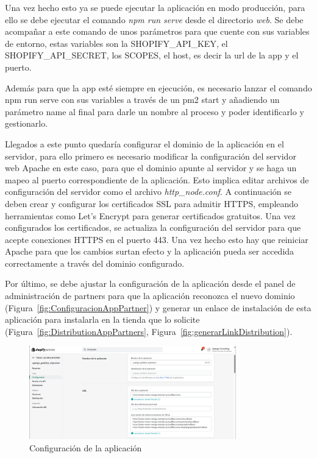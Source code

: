 \documentclass[12pt]{article}
\begin{document}
Una vez hecho esto ya se puede ejecutar la aplicación en modo producción, para ello se debe ejecutar el comando \textit{npm run serve} desde el directorio \textit{web}. Se debe acompañar
a este comando de unos parámetros para que cuente con sus variables de entorno, estas variables son la SHOPIFY\_API\_KEY, el SHOPIFY\_API\_SECRET, los SCOPES,  el host, es decir la url de la app y el puerto.

Además para que la app esté siempre en ejecución, es necesario lanzar el comando npm run serve con sus variables a través de un pm2 start y añadiendo un parámetro name al final para
darle un nombre al proceso y poder identificarlo y gestionarlo. 

Llegados a este punto quedaría configurar el dominio de la aplicación en el servidor, para ello primero es necesario modificar la configuración del servidor web Apache en este caso, para que 
el dominio apunte al servidor y se haga un mapeo al puerto correspondiente de la aplicación. Esto implica editar archivos de configuración del servidor como el archivo \textit{http\_node.conf}. 
A continuación se deben crear y configurar los certificados SSL para admitir HTTPS, empleando herramientas como Let's Encrypt para generar certificados gratuitos. Una vez configurados los
certificados, se actualiza la configuración del servidor para que acepte conexiones HTTPS en el puerto 443. Una vez hecho esto hay que reiniciar Apache para que los cambios surtan
efecto y la aplicación pueda ser accedida correctamente a través del dominio configurado.

Por último, se debe ajustar la configuración de la aplicación desde el panel de administración de partners para que la aplicación reconozca el nuevo dominio (Figura~\ref{fig:ConfiguracionAppPartner}) y generar un enlace de instalación de esta aplicación
para instalarla en la tienda que lo solicite (Figura~\ref{fig:DistributionAppPartners}, Figura~\ref{fig:generarLinkDistribution}).

\begin{figure}[ht]
    \centering
    \includegraphics[width=0.8\textwidth]{imagenes/panelPartnersDistribution.png}
    \caption{\label{fig:ConfiguracionAppPartners}Configuración de la aplicación}
    \vspace{\fill}
\end{figure}
\end{document}
